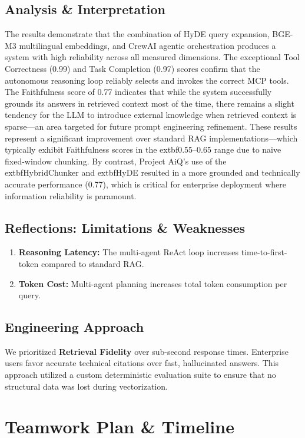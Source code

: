 \documentclass[12pt]{article}
\begin{document}
\subsection{Analysis \& Interpretation}
The results demonstrate that the combination of HyDE query expansion, BGE-M3 multilingual embeddings, and CrewAI agentic orchestration produces a system with high reliability across all measured dimensions. The exceptional Tool Correctness (0.99) and Task Completion (0.97) scores confirm that the autonomous reasoning loop reliably selects and invokes the correct MCP tools. The Faithfulness score of 0.77 indicates that while the system successfully grounds its answers in retrieved context most of the time, there remains a slight tendency for the LLM to introduce external knowledge when retrieved context is sparse---an area targeted for future prompt engineering refinement. These results represent a significant improvement over standard RAG implementations—which typically exhibit Faithfulness scores in the 	extbf{0.55--0.65 range} due to naive fixed-window chunking. By contrast, Project AiQ’s use of the 	extbf{HybridChunker} and 	extbf{HyDE} resulted in a more grounded and technically accurate performance (0.77), which is critical for enterprise deployment where information reliability is paramount.

\subsection{Reflections: Limitations \& Weaknesses}
\begin{enumerate}
    \item \textbf{Reasoning Latency:} The multi-agent ReAct loop increases time-to-first-token compared to standard RAG.
    \item \textbf{Token Cost:} Multi-agent planning increases total token consumption per query.
\end{enumerate}

\subsection{Engineering Approach}
We prioritized \textbf{Retrieval Fidelity} over sub-second response times. Enterprise users favor accurate technical citations over fast, hallucinated answers. This approach utilized a custom deterministic evaluation suite to ensure that no structural data was lost during vectorization.

\newpage
\section{Teamwork Plan \& Timeline}
\end{document}
